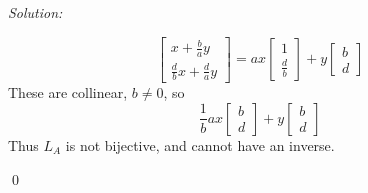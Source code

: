 \documentclass[11 pt]{article}
\newenvironment{sol}
    {\emph{Solution:}
    }
    {
    \qed
    }
\begin{document}
\begin{sol}
\[\begin{bmatrix}
x+\frac{b}{a}y\\\frac{d}{b}x+\frac{d}{a}y
\end{bmatrix}=ax\begin{bmatrix}
1\\\frac{d}{b}
\end{bmatrix}+y\begin{bmatrix}
b\\d
\end{bmatrix}\]
These are collinear, $b\ne 0$, so
\[\frac{1}{b}ax\begin{bmatrix}
b\\d
\end{bmatrix}+y\begin{bmatrix}
b\\d
\end{bmatrix}\]
Thus $L_A$ is not bijective, and cannot have an inverse.
\end{sol}

\end{document}
